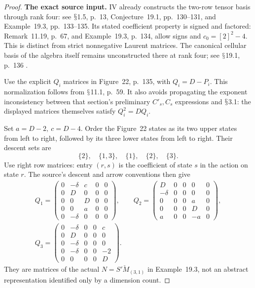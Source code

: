 \documentclass[11pt,a4paper]{article}
\renewcommand{\S}{\ensuremath{\mathsection}}
\theoremstyle{named}\newtheorem{finding}{Finding}[section]
\theoremstyle{definition}\newtheorem{definition}[finding]{Definition}
\theoremstyle{remark}\newtheorem{remark}[finding]{Remark}
\begin{document}
\begin{proof}
\par\smallskip\noindent\textbf{The exact source input.}\quad
IV already constructs the two-row tensor basis through rank four:
see \S1.5, p.~13, Conjecture~19.1, pp.~130--131, and
Example~19.3, pp.~133--135.
Its stated coefficient property is signed and factored:
Remark~11.19, p.~67, and Example~19.3, p.~134, allow signs and
\(c_0=[2]^2-4\).
This is distinct from strict nonnegative Laurent matrices.
The canonical cellular basis of the algebra itself remains
unconstructed there at rank four; see \S19.1, p.~136
\cite{IV}.

Use the explicit \(Q_i\) matrices in Figure~22, p.~135,
with \(Q_i=D-P_i\).
This normalization follows from \S11.1, p.~59.
It also avoids propagating the exponent inconsistency between
that section's preliminary \(C'_s,C_s\) expressions and
\S3.1: the displayed matrices themselves satisfy \(Q_i^2=DQ_i\).

Set \(a=D-2,\ c=D-4\). Order the Figure~22 states as its
two upper states from left to right, followed by its three
lower states from left to right. Their descent sets are
\[
 \{2\},\quad\{1,3\},\quad\{1\},\quad\{2\},\quad\{3\}.
\]
Use right row matrices: entry \((r,s)\) is the coefficient of
state \(s\) in the action on state \(r\). The source's descent
and arrow conventions then give
\begin{equation}\label{eq:rankfourfivecellmatrices}
\begin{gathered}
Q_1=\begin{pmatrix}
0&-\delta&c&0&0\\
0&D&0&0&0\\
0&0&D&0&0\\
0&0&a&0&0\\
0&-\delta&0&0&0
\end{pmatrix},\qquad
Q_2=\begin{pmatrix}
D&0&0&0&0\\
-\delta&0&0&0&0\\
0&0&0&a&0\\
0&0&0&D&0\\
a&0&0&-a&0
\end{pmatrix},\\[2mm]
Q_3=\begin{pmatrix}
0&-\delta&0&0&c\\
0&D&0&0&0\\
0&-\delta&0&0&0\\
0&-\delta&0&0&-2\\
0&0&0&0&D
\end{pmatrix}.
\end{gathered}
\end{equation}
They are matrices of the actual \(N=S'\check M_{(3,1)}\)
in Example~19.3, not an abstract representation identified
only by a dimension count.


\end{proof}
\end{document}
